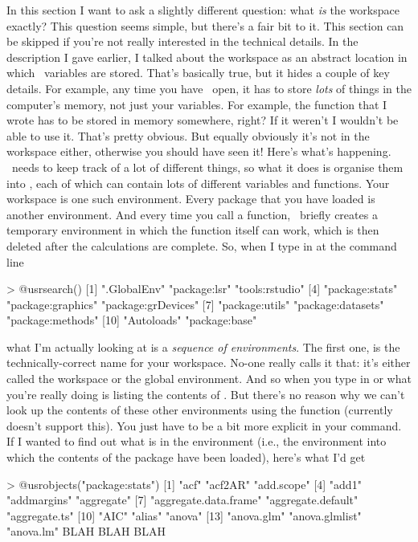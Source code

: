 In this section I want to ask a slightly different question: what {\it is} the workspace exactly? This question seems simple, but there's a fair bit to it. This section can be skipped if you're not really interested in the technical details. In the description I gave earlier, I talked about the workspace as an abstract location in which \R\ variables are stored. That's basically true, but it hides a couple of key details. For example, any time you have \R\ open, it has to store {\it lots} of things in the computer's memory, not just your variables. For example, the  function that I wrote has to be stored in memory somewhere, right? If it weren't I wouldn't be able to use it. That's pretty obvious. But equally obviously it's not in the workspace either, otherwise you should have seen it! Here's what's happening. \R\ needs to keep track of a lot of different things, so what it does is organise them into , each of which can contain lots of different variables and functions. Your workspace is one such environment. Every package that you have loaded is another environment. And every time you call a function, \R\ briefly creates a temporary environment in which the function itself can work, which is then deleted after the calculations are complete. So, when I type in  at the command line
\begin{rblock1}
> @usr{search()}
 [1] ".GlobalEnv"        "package:lsr"       "tools:rstudio"    
 [4] "package:stats"     "package:graphics"  "package:grDevices"
 [7] "package:utils"     "package:datasets"  "package:methods"  
[10] "Autoloads"         "package:base"    
\end{rblock1}
what I'm actually looking at is a {\it sequence of environments}. The first one,  is the technically-correct name for your workspace. No-one really calls it that: it's either called the workspace or the global environment. And so when you type in  or  what you're really doing is listing the contents of . But there's no reason why we can't look up the contents of these other environments using the  function (currently  doesn't support this). You just have to be a bit more explicit in your command. If I wanted to find out what is in the  environment (i.e., the environment into which the contents of the  package have been loaded), here's what I'd get
\begin{rblock1}
> @usr{objects("package:stats")}
  [1] "acf"                  "acf2AR"               "add.scope"           
  [4] "add1"                 "addmargins"           "aggregate"           
  [7] "aggregate.data.frame" "aggregate.default"    "aggregate.ts"        
 [10] "AIC"                  "alias"                "anova"               
 [13] "anova.glm"            "anova.glmlist"        "anova.lm"         
BLAH BLAH BLAH
\end{rblock1}
